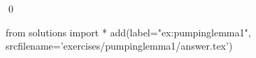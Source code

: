 
\begin{ex} 
  \label{ex:pumpinglemma1}
  
  \qed
\end{ex} 
\begin{python0}
from solutions import *
add(label="ex:pumpinglemma1",
    srcfilename='exercises/pumpinglemma1/answer.tex') 
\end{python0}
